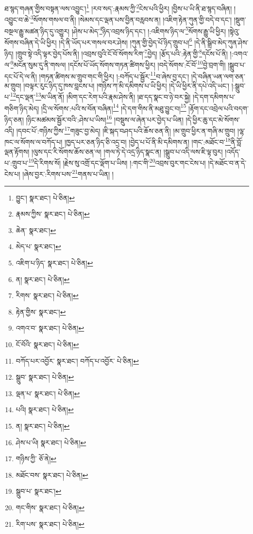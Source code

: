 ཐ་སྙད་གཞན་གྱིས་བསྟན་ལས་འབྱུང་།\footnote{བྱུང་།  སྣར་ཐང་།  པེ་ཅིན། } །རབ་སད་:རྣམས་ཀྱི་\footnote{རྣམས་ཀྱིས་  སྣར་ཐང་།  པེ་ཅིན། }ངེས་པའི་ཕྱིར། །བྱིས་པ་ཡི་ནི་ཐ་སྙད་བཞིན། །འབྱུང་བ་ཆེ་\footnote{ཆེན་  སྣར་ཐང་། }སོགས་གསལ་བ་ནི། །སེམས་དང་ལྡན་པས་བྱིན་བརླབས་ན། །འཇིག་རྟེན་ཀུན་གྱི་བདེ་བ་དང་། །སྡུག་བསྔལ་རྒྱུ་མཚན་ཉིད་དུ་འགྱུར། །ཤེས་པ་མེད་\footnote{མེད་པ་  སྣར་ཐང་། }ཉིད་འབྲས་ཉིད་དང་། །:འཇིགས་ཉིད་ལ་\footnote{འཇིག་པ་ཉིད་  སྣར་ཐང་།  པེ་ཅིན། }སོགས་རྒྱུ་ཡི་ཕྱིར། །སྟེའུ་སོགས་བཞིན་དེ་ཡི་ཕྱིར། །དེ་ནི་ཡོད་པར་གསལ་བར་ཤེས། །ཀུན་གྱི་བྱེད་པོ་ཉིད་གྲུབ་པ།\footnote{ན།  སྣར་ཐང་།  པེ་ཅིན། } །དེ་ནི་སྒྲིབ་མེད་ཀུན་ཤེས་ཉིད། །གྲུབ་སྟེ་འདི་ལྟར་བྱེད་པོས་ནི། །འབྲས་བུའི་ངོ་བོ་སོགས་རིག་\footnote{རིགས་  སྣར་ཐང་།  པེ་ཅིན། }བྱེད། །རྩོད་པའི་:རྟེན་གྱི་\footnote{རྟེན་གྱིས་  སྣར་ཐང་། }དངོས་པོ་ནི། །:འགའ་ལ་\footnote{འགའ་བ་  སྣར་ཐང་།  པེ་ཅིན། }མངོན་སུམ་དུ་ནི་གསལ། །དངོས་པོ་ཡོད་སོགས་གཏན་ཚིགས་ཕྱིར། །བདེ་སོགས་:ངོ་བོ་\footnote{ངོ་བོའི་  སྣར་ཐང་།  པེ་ཅིན། }བྱེ་བྲག་གི། །སྒྲུབ་པ་དང་པོ་དེ་ལ་ནི། །གཏན་ཚིགས་མ་གྲུབ་གང་གི་ཕྱིར། །:བཀོད་པ་སྦྱོར་\footnote{བཀོད་པར་འབྱོར་  སྣར་ཐང་། བཀོད་པ་འབྱོར་  པེ་ཅིན། }བ་ཞེས་བྱ་དང་། །དེ་བཞིན་ཡན་ལག་ཅན་མ་གྲུབ། །བལྟར་རུང་ཉིད་དུ་ཁས་བླངས་པ། །གཉིས་ཀ་མི་དམིགས་པ་ཡི་ཕྱིར། །དེ་ཡི་ཕྱིར་ནི་དཔེ་འདི་ཡང་། །:སྒྲུབ་པ་\footnote{སྒྲུབ་  སྣར་ཐང་།  པེ་ཅིན། }དང་ལྡན་\footnote{ལྡན་པ་  སྣར་ཐང་།  པེ་ཅིན། }མ་ཡིན་ནོ། །མིག་དང་རེག་པའི་རྣམ་ཤེས་ནི། །ཐ་དད་སྣང་བ་ཉེ་བར་སྐྱེ། །དེ་དག་དམིགས་པ་གཅིག་ཉིད་མེད། །དྲི་ལ་སོགས་:པའི་ས་བོན་བཞིན།\footnote{པའི།  སྣར་ཐང་།  པེ་ཅིན། } །དེ་དག་གིས་ནི་མཐུ་བྱུང་བ།\footnote{ན།  སྣར་ཐང་།  པེ་ཅིན། } །རྟོག་དང་འབྲེལ་པའི་བདག་ཉིད་ཅན། །ཉིང་མཚམས་སྦྱོར་བའི་:ཤེས་པ་ཡིས།\footnote{ཤེས་པ་ཡི།  སྣར་ཐང་།  པེ་ཅིན། } །བསྡུས་ལ་ཞེན་པར་བྱེད་པ་ཡིན། །དེ་ཕྱིར་ཆུ་དང་མེ་སོགས་འདི། །དབང་པོ་:གཉིས་ཀྱིས་\footnote{གཉིས་ཀྱི་  ཅོ་ནེ། }གཟུང་བྱ་མེད། །ཇི་སྐད་བཤད་པའི་ཆོས་ཅན་ནི། །མ་གྲུབ་ཕྱིར་ན་གཞི་མ་གྲུབ། །ལྷ་ཁང་ལ་སོགས་ལ་བཀོད་པ། །ཁྱད་པར་ཅན་ཉིད་ཅི་འདྲ་བ། །བྱེད་པ་པོ་ནི་མི་དམིགས་ན། །གང་:མཐོང་བ་\footnote{མཐོང་བས་  སྣར་ཐང་།  པེ་ཅིན། }ནི་བློ་ལྡན་རྟོགས། །ལུས་དང་རི་སོགས་ཆོས་ཅན་ལ། །གལ་ཏེ་དེ་འདྲ་ཉིད་སྣང་ན། །སྒྲུབ་པ་འདི་ལས་ཇི་ལྟ་བུར། །འདོད་པ་:གྲུབ་པ་\footnote{སྒྲུབ་པ་  སྣར་ཐང་། }དེ་རིགས་སོ། །རྗེས་སུ་འགྲོ་དང་ལྡོག་པ་ཡིས། །:གང་གི་\footnote{གང་གིས་  སྣར་ཐང་།  པེ་ཅིན། }འབྲས་བུར་གང་ངེས་པ། །དེ་མཐོང་བ་ན་དེ་ངེས་པ། །ཞེས་བྱར་:རིགས་པས་\footnote{རིག་པས་  སྣར་ཐང་།  པེ་ཅིན། }གནས་པ་ཡིན། །
